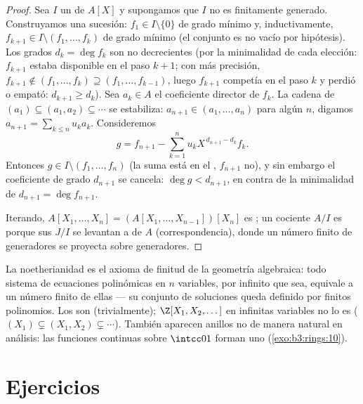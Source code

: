 \begin{proof}
Sea $I$ un  de $A[X]$ y supongamos que
$I$ no es finitamente generado. Construyamos una sucesión:
$f_1 \in I \setminus \{0\}$ de grado mínimo y, inductivamente,
$f_{k+1} \in I \setminus (f_1,
\dots, f_k)$ de grado mínimo (el conjunto es no vacío por hipótesis).
Los grados $d_k = \deg f_k$ son no decrecientes (por la minimalidad de
cada elección: $f_{k+1}$ estaba disponible en el paso $k+1$; con más
precisión, $f_{k+1} \notin (f_1,\dots,f_k) \supseteq
(f_1, \dots, f_{k-1})$, luego $f_{k+1}$ competía en el paso $k$ y perdió
o empató: $d_{k+1} \geq d_k$). Sea $a_k \in A$ el coeficiente director
de $f_k$. La cadena de 
$(a_1) \subseteq (a_1,
a_2) \subseteq \cdots$ se estabiliza: $a_{n+1} \in (a_1, \dots,
a_n)$ para algún $n$, digamos $a_{n+1} = \sum_{k\leq n} u_k a_k$.
Consideremos
\[
g = f_{n+1} - \sum_{k=1}^{n} u_k X^{\,d_{n+1} - d_k} f_k .
\]
Entonces $g \in I \setminus (f_1, \dots, f_n)$ (la suma está en el
, $f_{n+1}$ no), y sin embargo el
coeficiente de grado $d_{n+1}$ se cancela: $\deg g < d_{n+1}$, en contra
de la minimalidad de $d_{n+1} = \deg f_{n+1}$.

Iterando, $A[X_1, \dots, X_n] = (A[X_1, \dots, X_{n-1}])[X_n]$ es
; un cociente $A/I$ es
 porque sus
 $J/I$ se levantan a
 de $A$ (correspondencia), donde un
número finito de generadores se proyecta sobre generadores.
\end{proof}

\begin{remark}\label{rem:b3:rings:noethmeaning}
La noetherianidad es el axioma de finitud de la geometría algebraica:
todo sistema de ecuaciones polinómicas en $n$ variables, por infinito
que sea, equivale a un número finito de ellas --- su conjunto de
soluciones queda definido por finitos polinomios. Los
 son
 (trivialmente);
$\Z[X_1, X_2, \dots]$ en infinitas variables no lo es
($(X_1) \subsetneq (X_1, X_2) \subsetneq \cdots$). También aparecen
anillos no  de manera
natural en análisis: las funciones continuas sobre $\intcc01$ forman uno
(\cref{exo:b3:rings:10}).
\end{remark}

\section{Ejercicios}

